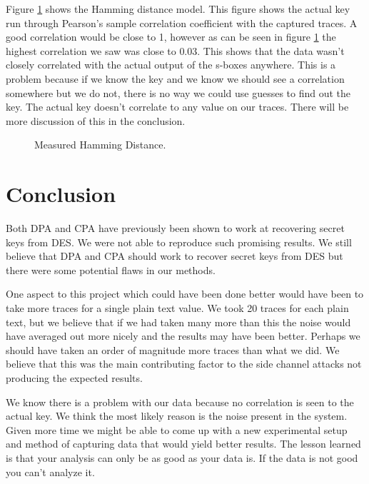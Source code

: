   Figure \ref{fig:cor} shows the Hamming distance model.  This figure shows the actual key run through Pearson's sample correlation coefficient with the captured traces.  A good correlation would be close to 1, however as can be seen in figure \ref{fig:cor} the highest correlation we saw was close to 0.03.  This shows that the data wasn't closely correlated with the actual output of the s-boxes anywhere.  This is a problem because if we know the key and we know we should see a correlation somewhere but we do not, there is no way we could use guesses to find out the key.  The actual key doesn't correlate to any value on our traces.  There will be more discussion of this in the conclusion.

	\begin{figure}[h]
	
	\caption{Measured Hamming Distance.}
	\label{fig:cor}
	\end{figure}
  
\section{Conclusion}\label{sec::conclusion} 


	Both DPA and CPA have previously been shown to work at recovering secret keys from DES.  We were not able to reproduce such promising results.  We still believe that DPA and CPA should work to recover secret keys from DES but there were some potential flaws in our methods.
	
  	One aspect to this project which could have been done better would have been to take more traces for a single plain text value.  We took 20 traces for each plain text, but we believe that if we had taken many more than this the noise would have averaged out more nicely and the results may have been better.  Perhaps we should have taken an order of magnitude more traces than what we did.  We believe that this was the main contributing factor to the side channel attacks not producing the expected results.
  	
  	We know there is a problem with our data because no correlation is seen to the actual key.  We think the most likely reason is the noise present in the system.  Given more time we might be able to come up with a new experimental setup and method of capturing data that would yield better results.  The lesson learned is that your analysis can only be as good as your data is.  If the data is not good you can't analyze it.


